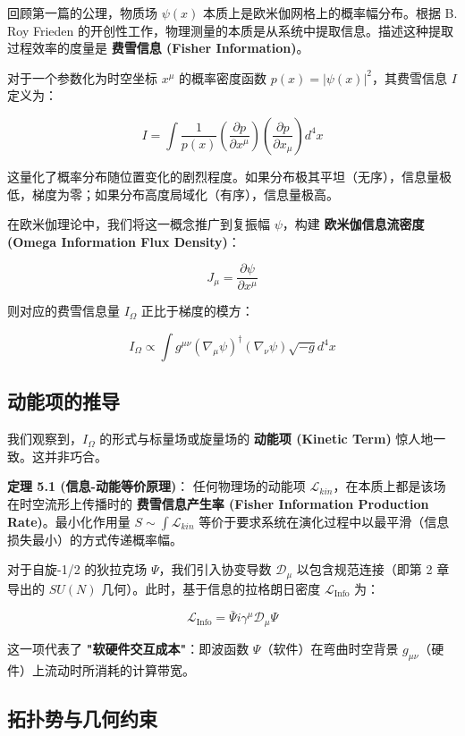 回顾第一篇的公理，物质场 $\psi(x)$ 本质上是欧米伽网格上的概率幅分布。根据 B. Roy Frieden 的开创性工作，物理测量的本质是从系统中提取信息。描述这种提取过程效率的度量是 \textbf{费雪信息 (Fisher Information)}。

对于一个参数化为时空坐标 $x^\mu$ 的概率密度函数 $p(x) = |\psi(x)|^2$，其费雪信息 $I$ 定义为：

\[I = \int \frac{1}{p(x)} \left( \frac{\partial p}{\partial x^\mu} \right) \left( \frac{\partial p}{\partial x_\mu} \right) d^4x\]

这量化了概率分布随位置变化的剧烈程度。如果分布极其平坦（无序），信息量极低，梯度为零；如果分布高度局域化（有序），信息量极高。

在欧米伽理论中，我们将这一概念推广到复振幅 $\psi$，构建 \textbf{欧米伽信息流密度 (Omega Information Flux Density)}：

\[J_\mu = \frac{\partial \psi}{\partial x^\mu}\]

则对应的费雪信息量 $I_\Omega$ 正比于梯度的模方：

\[I_\Omega \propto \int g^{\mu\nu} (\nabla_\mu \psi)^\dagger (\nabla_\nu \psi) \sqrt{-g} d^4x\]

\subsection{动能项的推导}

我们观察到，$I_\Omega$ 的形式与标量场或旋量场的 \textbf{动能项 (Kinetic Term)} 惊人地一致。这并非巧合。

\textbf{定理 5.1 (信息-动能等价原理)}：
任何物理场的动能项 $\mathcal{L}_{kin}$，在本质上都是该场在时空流形上传播时的 \textbf{费雪信息产生率 (Fisher Information Production Rate)}。最小化作用量 $S \sim \int \mathcal{L}_{kin}$ 等价于要求系统在演化过程中以最平滑（信息损失最小）的方式传递概率幅。

对于自旋-1/2 的狄拉克场 $\Psi$，我们引入协变导数 $\mathcal{D}_\mu$ 以包含规范连接（即第 2 章导出的 $SU(N)$ 几何）。此时，基于信息的拉格朗日密度 $\mathcal{L}_{\text{Info}}$ 为：

\[\mathcal{L}_{\text{Info}} = \bar{\Psi} i \gamma^\mu \mathcal{D}_\mu \Psi\]

这一项代表了 \textbf{"软硬件交互成本"}：即波函数 $\Psi$（软件）在弯曲时空背景 $g_{\mu\nu}$（硬件）上流动时所消耗的计算带宽。

\subsection{拓扑势与几何约束}

